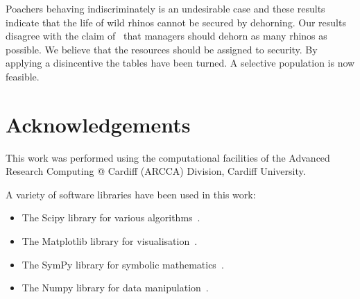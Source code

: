 \documentclass[10pt]{article}
\begin{document}
Poachers behaving indiscriminately is an undesirable case and these results
indicate that the life of wild rhinos cannot be secured by dehorning. 
Our results disagree with the claim of~\cite{Milner1992} that managers
should dehorn as many rhinos as possible. We believe that the resources should
be assigned to security. By applying a disincentive the tables have been turned.
A selective population is now feasible.

\section*{Acknowledgements}

This work was performed using the computational facilities of the Advanced
Research Computing @ Cardiff (ARCCA) Division, Cardiff University.

A variety of software libraries have been used in this work:

\begin{itemize}
    \item The Scipy library for various algorithms~\cite{scipy}.
    \item The Matplotlib library for visualisation~\cite{hunter2007matplotlib}.
    \item The SymPy library for symbolic mathematics~\cite{sympy}.
    \item The Numpy library for data manipulation~\cite{walt2011numpy}.
\end{itemize}




\end{document}
